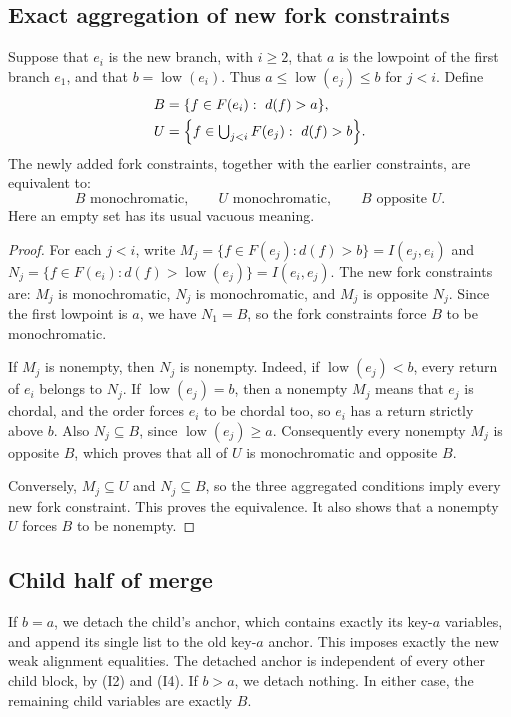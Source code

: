 \documentclass[11pt]{article}
\DeclareMathOperator{\low}{low}
\begin{document}
\subsection*{Exact aggregation of new fork constraints}

Suppose that $e_i$ is the new branch, with $i\ge2$, that $a$ is the lowpoint of
the first branch $e_1$, and that $b=\low(e_i)$. Thus $a\le\low(e_j)\le b$ for
$j<i$. Define
\begin{align*}
B&=\{f\in F(e_i):\ d(f)>a\},\\
U&=\Bigl\{f\in\textstyle\bigcup_{j<i}F(e_j):\ d(f)>b\Bigr\}.
\end{align*}
The newly added fork constraints, together with the earlier constraints, are
equivalent to:
\begin{equation*}
B\text{ monochromatic},\qquad U\text{ monochromatic},\qquad B\text{ opposite }U.
\end{equation*}
Here an empty set has its usual vacuous meaning.

\begin{proof}
For each $j<i$, write $M_j=\{f\in F(e_j):d(f)>b\}=I(e_j,e_i)$ and
$N_j=\{f\in F(e_i):d(f)>\low(e_j)\}=I(e_i,e_j)$. The new fork constraints are:
$M_j$ is monochromatic, $N_j$ is monochromatic, and $M_j$ is opposite $N_j$.
Since the first lowpoint is $a$, we have $N_1=B$, so the fork constraints force
$B$ to be monochromatic.

If $M_j$ is nonempty, then $N_j$ is nonempty. Indeed, if $\low(e_j)<b$, every
return of $e_i$ belongs to $N_j$. If $\low(e_j)=b$, then a nonempty $M_j$ means
that $e_j$ is chordal, and the order forces $e_i$ to be chordal too, so $e_i$
has a return strictly above $b$. Also $N_j\subseteq B$, since
$\low(e_j)\ge a$. Consequently every nonempty $M_j$ is opposite $B$, which
proves that all of $U$ is monochromatic and opposite $B$.

Conversely, $M_j\subseteq U$ and $N_j\subseteq B$, so the three aggregated
conditions imply every new fork constraint. This proves the equivalence. It
also shows that a nonempty $U$ forces $B$ to be nonempty.
\end{proof}

\subsection*{Child half of merge}

If $b=a$, we detach the child's anchor, which contains exactly its key-$a$
variables, and append its single list to the old key-$a$ anchor. This imposes
exactly the new weak alignment equalities. The detached anchor is independent
of every other child block, by (I2) and (I4). If $b>a$, we detach nothing. In
either case, the remaining child variables are exactly $B$.
\end{document}
